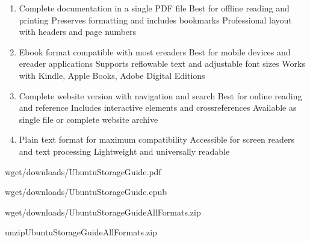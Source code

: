 \documentclass[letterpaper,10pt,english]{sphinxmanual}
\begin{document}
\sphinxAtStartPar
{}
\begin{enumerate}
%
\item {} 
\sphinxAtStartPar
{}
\sphinxhyphen{} Complete documentation in a single PDF file
\sphinxhyphen{} Best for offline reading and printing
\sphinxhyphen{} Preserves formatting and includes bookmarks
\sphinxhyphen{} Professional layout with headers and page numbers

\item {} 
\sphinxAtStartPar
{}
\sphinxhyphen{} E\sphinxhyphen{}book format compatible with most e\sphinxhyphen{}readers
\sphinxhyphen{} Best for mobile devices and e\sphinxhyphen{}reader applications
\sphinxhyphen{} Supports reflowable text and adjustable font sizes
\sphinxhyphen{} Works with Kindle, Apple Books, Adobe Digital Editions

\item {} 
\sphinxAtStartPar
{}
\sphinxhyphen{} Complete website version with navigation and search
\sphinxhyphen{} Best for online reading and reference
\sphinxhyphen{} Includes interactive elements and cross\sphinxhyphen{}references
\sphinxhyphen{} Available as single file or complete website archive

\item {} 
\sphinxAtStartPar
{}
\sphinxhyphen{} Plain text format for maximum compatibility
\sphinxhyphen{} Accessible for screen readers and text processing
\sphinxhyphen{} Lightweight and universally readable

\end{enumerate}

\sphinxAtStartPar
{}

\begin{sphinxVerbatim}[commandchars=\\\{\}]

wget/downloads/Ubuntu\PYGZhy{}Storage\PYGZhy{}Guide.pdf

wget/downloads/Ubuntu\PYGZhy{}Storage\PYGZhy{}Guide.epub

wget/downloads/Ubuntu\PYGZhy{}Storage\PYGZhy{}Guide\PYGZhy{}All\PYGZhy{}Formats.zip

unzipUbuntu\PYGZhy{}Storage\PYGZhy{}Guide\PYGZhy{}All\PYGZhy{}Formats.zip
\end{sphinxVerbatim}
\end{document}
